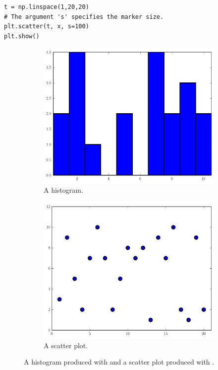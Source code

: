 \begin{lstlisting}
t = np.linspace(1,20,20)
# The argument 's' specifies the marker size.
plt.scatter(t, x, s=100)
plt.show()
\end{lstlisting}


\begin{figure}
\centering
\begin{subfigure}[t]{.49\textwidth}
\centering
\includegraphics[width=\textwidth]{histogram.pdf}
\caption{A histogram.}
\label{fig:histogram}
\end{subfigure}
\begin{subfigure}[t]{.49\textwidth}
\centering
\includegraphics[width=\textwidth]{scatter.pdf}
\caption{A scatter plot.}
\label{fig:scatter}
\end{subfigure}

\caption{A histogram produced with  and a scatter plot produced with .}
\label{fig:otherplots}
\end{figure}

